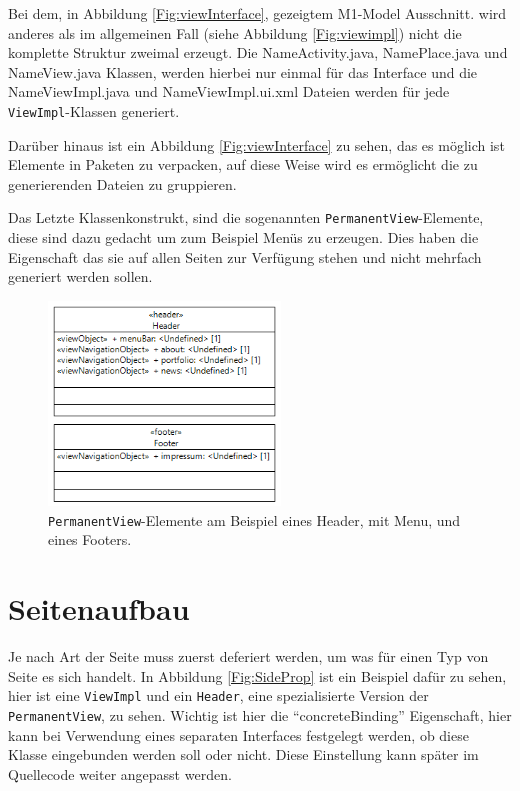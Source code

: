 Bei dem, in Abbildung \ref{Fig:viewInterface}, gezeigtem M1-Model Ausschnitt.
wird anderes als im allgemeinen Fall (siehe Abbildung  \ref{Fig:viewimpl}) nicht
die komplette Struktur zweimal erzeugt. Die \grqq{}Name\grqq{}Activity.java,
\grqq{}Name\grqq{}Place.java und \grqq{}Name\grqq{}View.java Klassen, werden
hierbei nur einmal für das Interface und die \grqq{}Name\grqq{}ViewImpl.java und
\grqq{}Name\grqq{}ViewImpl.ui.xml Dateien werden für jede
\texttt{ViewImpl}-Klassen generiert. 

Darüber hinaus ist ein Abbildung \ref{Fig:viewInterface} zu sehen, das es
möglich ist Elemente in Paketen zu verpacken, auf diese Weise wird es
ermöglicht die zu generierenden Dateien zu gruppieren. 

\newpage
Das Letzte Klassenkonstrukt, sind die sogenannten
\texttt{PermanentView}-Elemente, diese sind dazu gedacht um zum Beispiel Menüs
zu erzeugen. Dies haben die Eigenschaft das sie auf allen Seiten zur Verfügung
stehen und nicht mehrfach generiert werden sollen.

\begin{figure}[htbp]
\begin{center}
\includegraphics[width=0.55\textwidth]{./img/Header_Footer.png}
\caption{\texttt{PermanentView}-Elemente am Beispiel
eines Header, mit Menu, und eines Footers.}\label{Fig:headerFooter}
\end{center}
\end{figure} 

\newpage
\section{Seitenaufbau}
Je nach Art der Seite muss zuerst deferiert werden, um was für einen Typ von
Seite es sich handelt. In Abbildung \ref{Fig:SideProp} ist ein Beispiel dafür
zu sehen, hier ist eine \texttt{ViewImpl} und ein \texttt{Header}, eine
spezialisierte Version der \texttt{PermanentView}, zu sehen. Wichtig ist hier
die "`concreteBinding"' Eigenschaft, hier kann bei Verwendung eines
separaten Interfaces festgelegt werden, ob diese Klasse eingebunden werden soll
oder nicht. Diese Einstellung kann später im Quellecode weiter angepasst werden.

